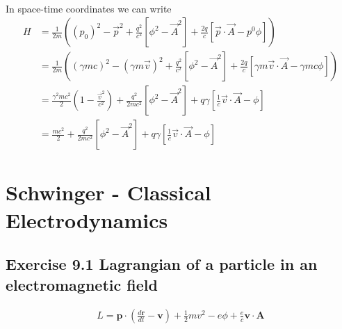 \documentclass[../main.tex]{subfiles}
\begin{document}
\begin{enumerate}
\begin{align}
\end{align}
In space-time coordinates we can write
\begin{align}
H&=\frac{1}{2m}\left((p_0)^2-\vec{p}^2+\frac{q^2}{c^2}[\phi^2-\vec{A}^2]+\frac{2q}{c}[\vec{p}\cdot\vec{A}-p^0\phi]\right)\\
&=\frac{1}{2m}\left((\gamma m c)^2-(\gamma m\vec{v})^2+\frac{q^2}{c^2}[\phi^2-\vec{A}^2]+\frac{2q}{c}[\gamma m\vec{v}\cdot\vec{A}-\gamma m c\phi]\right)\\
&=\frac{\gamma^2mc^2}{2}\left(1-\frac{\vec{v}^2}{c^2}\right)+\frac{q^2}{2mc^2}[\phi^2-\vec{A}^2]+q\gamma[\frac{1}{c}\vec{v}\cdot\vec{A}- \phi]\\
&=\frac{mc^2}{2}+\frac{q^2}{2mc^2}[\phi^2-\vec{A}^2]+q\gamma[\frac{1}{c}\vec{v}\cdot\vec{A}- \phi]
\end{align}
\end{enumerate}

\section{{\sc Schwinger} - Classical Electrodynamics}
\subsection{Exercise 9.1 Lagrangian of a particle in an electromagnetic field}
\begin{align}
L=\mathbf{p}\cdot\left(\frac{d\mathbf{r}}{dt}-\mathbf{v}\right)+\frac{1}{2}mv^2-e\phi+\frac{e}{c}\mathbf{v}\cdot\mathbf{A}
\end{align}
\end{document}
